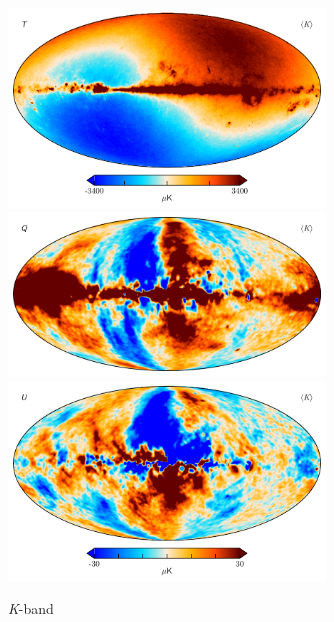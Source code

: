 \documentclass[twocolumn]{../../common/aa}
\newcommand{\K}[0]{\textit K}
\begin{document}
\begin{figure}
	\centering
	\includegraphics[width=0.75\textwidth]{figures/023-WMAP_K_mu_I.pdf}
	\includegraphics[width=0.75\textwidth]{figures/023-WMAP_K_mu_Q.pdf}
	\includegraphics[width=0.75\textwidth]{figures/023-WMAP_K_mu_U.pdf}
	\caption{\K-band}
\end{figure}
\end{document}
